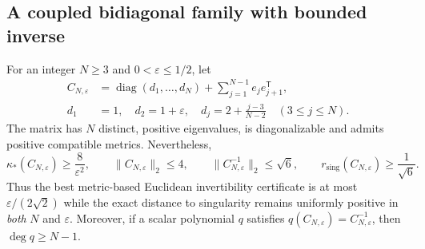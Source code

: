 \subsection{A coupled bidiagonal family with bounded inverse}
\begin{theorem}
\label{thm:growingchain}
For an integer $N\geq3$ and $0<\varepsilon\leq1/2$, let
\begin{equation}\label{eq:growingchain}
 \begin{aligned}
 C_{N,\varepsilon}&=\operatorname{diag}(d_1,\ldots,d_N)
  +\sum_{j=1}^{N-1}e_je_{j+1}^{\mathsf T},\\
 d_1&=1,\quad d_2=1+\varepsilon,\quad
 d_j=2+\frac{j-3}{N-2}\quad (3\leq j\leq N).
 \end{aligned}
\end{equation}
The matrix has $N$ distinct, positive eigenvalues, is diagonalizable and
admits positive compatible metrics. Nevertheless,
\begin{equation}\label{eq:growing_bounds}
\kappa_*(C_{N,\varepsilon})\geq\frac{8}{\varepsilon^2},
\qquad \|C_{N,\varepsilon}\|_2\leq4,
\qquad \|C_{N,\varepsilon}^{-1}\|_2\leq\sqrt6,
\qquad r_{\mathrm{sing}}(C_{N,\varepsilon})\geq\frac1{\sqrt6}.
\end{equation}
Thus the best metric-based Euclidean invertibility certificate is at most
$\varepsilon/(2\sqrt2)$ while the exact distance to singularity remains uniformly
positive in \emph{both} $N$ and $\varepsilon$. Moreover, if a scalar polynomial
$q$ satisfies $q(C_{N,\varepsilon})=C_{N,\varepsilon}^{-1}$,
then $\deg q\geq N-1$.
\end{theorem}
